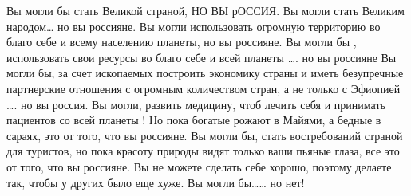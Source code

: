 Вы могли бы стать Великой страной, НО ВЫ рОССИЯ.
Вы могли стать Великим народом… но вы россияне.
Вы могли использовать огромную территорию во благо себе и всему населению планеты, но вы россияне.
Вы могли бы , использовать свои ресурсы во благо себе и всей планеты …. но вы россияне
Вы могли бы, за счет ископаемых построить экономику страны и иметь безупречные партнерские отношения с огромным количеством стран, а не только с Эфиопией …. но вы россия.
Вы могли, развить медицину, чтоб лечить себя и принимать пациентов со всей планеты ! Но пока богатые рожают в Майями, а бедные в сараях, это от того, что вы россияне.
Вы могли бы, стать востребований страной для туристов, но пока красоту природы видят только ваши пьяные глаза, все это от того, что вы россияне.
Вы не можете сделать себе хорошо, поэтому делаете так, чтобы у других было еще хуже.
Вы могли бы…… но нет!
